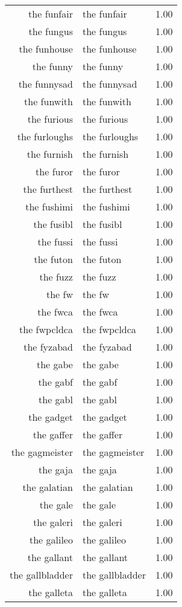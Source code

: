 \begin{table}[ht]
\begin{tabular}{rlr}
  the funfair & the funfair & 1.00 \\ 
  the fungus & the fungus & 1.00 \\ 
  the funhouse & the funhouse & 1.00 \\ 
  the funny & the funny & 1.00 \\ 
  the funnysad & the funnysad & 1.00 \\ 
  the funwith & the funwith & 1.00 \\ 
  the furious & the furious & 1.00 \\ 
  the furloughs & the furloughs & 1.00 \\ 
  the furnish & the furnish & 1.00 \\ 
  the furor & the furor & 1.00 \\ 
  the furthest & the furthest & 1.00 \\ 
  the fushimi & the fushimi & 1.00 \\ 
  the fusibl & the fusibl & 1.00 \\ 
  the fussi & the fussi & 1.00 \\ 
  the futon & the futon & 1.00 \\ 
  the fuzz & the fuzz & 1.00 \\ 
  the fw & the fw & 1.00 \\ 
  the fwca & the fwca & 1.00 \\ 
  the fwpcldca & the fwpcldca & 1.00 \\ 
  the fyzabad & the fyzabad & 1.00 \\ 
  the gabe & the gabe & 1.00 \\ 
  the gabf & the gabf & 1.00 \\ 
  the gabl & the gabl & 1.00 \\ 
  the gadget & the gadget & 1.00 \\ 
  the gaffer & the gaffer & 1.00 \\ 
  the gagmeister & the gagmeister & 1.00 \\ 
  the gaja & the gaja & 1.00 \\ 
  the galatian & the galatian & 1.00 \\ 
  the gale & the gale & 1.00 \\ 
  the galeri & the galeri & 1.00 \\ 
  the galileo & the galileo & 1.00 \\ 
  the gallant & the gallant & 1.00 \\ 
  the gallbladder & the gallbladder & 1.00 \\ 
  the galleta & the galleta & 1.00 \\ 

\end{tabular}
\end{table}
